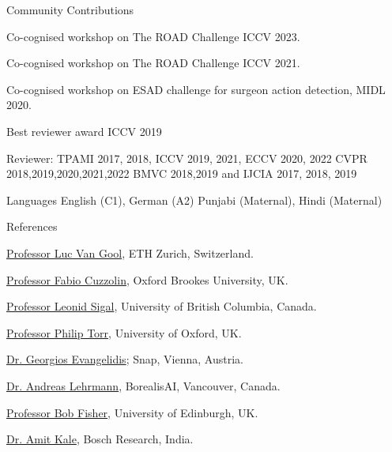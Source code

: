 \documentclass{resume_long} %
\begin{document}
\clearpage

\vspace{0.1in}
\begin{rSection}{Community Contributions}{} \itemsep -2pt
    \item Co-cognised workshop on The ROAD Challenge ICCV 2023.
    \item Co-cognised workshop on The ROAD Challenge ICCV 2021.
    \item Co-cognised workshop on ESAD challenge for surgeon action detection, MIDL 2020.
    \item Best reviewer award ICCV 2019
    \item Reviewer: TPAMI 2017, 2018, ICCV 2019, 2021, ECCV 2020, 2022 CVPR 2018,2019,2020,2021,2022 BMVC 2018,2019 and IJCIA 2017, 2018, 2019
\end{rSection}


\vspace{0.1in}
\begin{rSection}{Languages}{}  \itemsep -2pt
  English (C1), German (A2) Punjabi (Maternal), Hindi (Maternal)
\end{rSection}

\vspace{0.1in}
\begin{rSection}{References}{}  \itemsep -2pt
\item \href{https://ee.ethz.ch/the-department/faculty/professors/person-detail.OTAyMzM=.TGlzdC80MTEsMTA1ODA0MjU5.html}{Professor Luc Van Gool}, ETH Zurich, Switzerland.
\item \href{http://cms.brookes.ac.uk/staff/FabioCuzzolin/}{Professor Fabio Cuzzolin}, Oxford Brookes University, UK.
\item \href{https://www.cs.ubc.ca/~lsigal/}{Professor Leonid Sigal}, University of British Columbia, Canada.
\item \href{http://www.robots.ox.ac.uk/~phst/}{Professor Philip Torr}, University of Oxford, UK.
\item \href{https://team.inria.fr/perception/team-members/evangelidis/}{Dr. Georgios Evangelidis}; Snap, Vienna, Austria.
\item \href{https://ps.is.tuebingen.mpg.de/person/alehrmann}{Dr. Andreas Lehrmann}, BorealisAI, Vancouver, Canada.
\item \href{http://homepages.inf.ed.ac.uk/rbf/}{Professor Bob Fisher}, University of Edinburgh, UK.
\item \href{http://www.cfar.umd.edu/~kale/}{Dr. Amit Kale}, Bosch Research, India.
\end{rSection}
\end{document}
